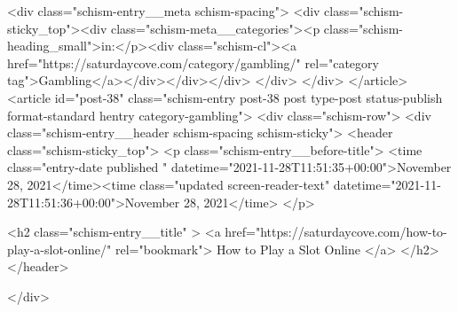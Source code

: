 {		<div class="schism-entry__meta schism-spacing">			<div class="schism-sticky_top"><div class="schism-meta__categories"><p class="schism-heading_small">in:</p><div class="schism-cl"><a href="https://saturdaycove.com/category/gambling/" rel="category tag">Gambling</a></div></div></div>		</div>
	</div>
</article>
<article id="post-38" class="schism-entry post-38 post type-post status-publish format-standard hentry category-gambling">
	<div class="schism-row">		<div class="schism-entry__header schism-spacing schism-sticky">			<header class="schism-sticky_top">				<p class="schism-entry__before-title">
					<time class="entry-date published " datetime="2021-11-28T11:51:35+00:00">November 28, 2021</time><time class="updated screen-reader-text" datetime="2021-11-28T11:51:36+00:00">November 28, 2021</time>				</p>

				<h2 class="schism-entry__title" >
					<a href="https://saturdaycove.com/how-to-play-a-slot-online/" rel="bookmark">
						How to Play a Slot Online					</a>
				</h2>
			</header>

					</div>

}

